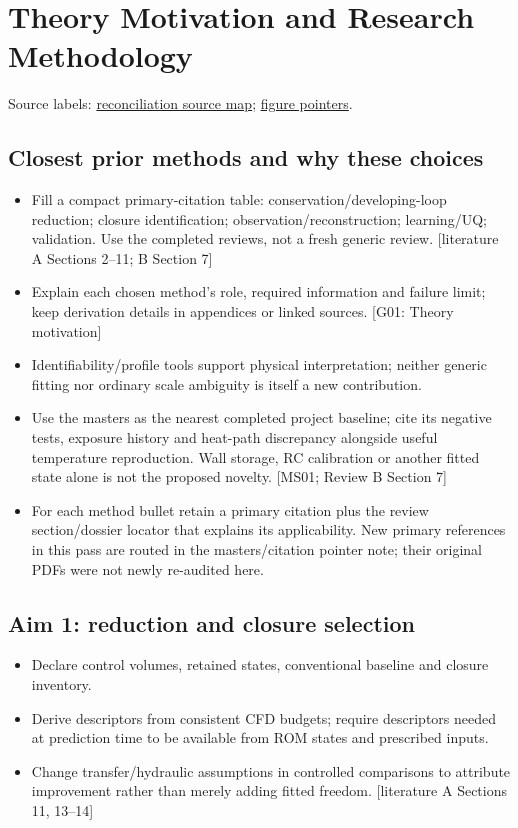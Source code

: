 \section{Theory Motivation and Research Methodology}
\noindent\small Source labels: \href{run:doc_support/reconciliation/2026-11-02/SOURCES.md}{reconciliation source map}; \href{run:doc_support/reconciliation/2026-11-02/FIGURE_POINTERS.md}{figure pointers}.\normalsize

\subsection{Closest prior methods and why these choices}
\begin{itemize}[leftmargin=*]
\item Fill a compact primary-citation table: conservation/developing-loop reduction; closure identification; observation/reconstruction; learning/UQ; validation. Use the completed reviews, not a fresh generic review. [literature A Sections 2--11; B Section 7]
\item Explain each chosen method's role, required information and failure limit; keep derivation details in appendices or linked sources. [G01: Theory motivation]
\item Identifiability/profile tools support physical interpretation; neither generic fitting nor ordinary scale ambiguity is itself a new contribution.\cite{raue2009identifiability}
\item Use the master\textquotesingle{}s as the nearest completed project baseline; cite its negative tests, exposure history and heat-path discrepancy alongside useful temperature reproduction. Wall storage, RC calibration or another fitted state alone is not the proposed novelty. [MS01; Review B Section 7]\cite{fierro2026cfdoneD}
\item For each method bullet retain a primary citation plus the review section/dossier locator that explains its applicability. New primary references in this pass are routed in the master\textquotesingle{}s/citation pointer note; their original PDFs were not newly re-audited here.
\end{itemize}

\subsection{Aim 1: reduction and closure selection}
\begin{itemize}[leftmargin=*]
\item Declare control volumes, retained states, conventional baseline and closure inventory.
\item Derive descriptors from consistent CFD budgets; require descriptors needed at prediction time to be available from ROM states and prescribed inputs.
\item Change transfer/hydraulic assumptions in controlled comparisons to attribute improvement rather than merely adding fitted freedom. [literature A Sections 11, 13--14]
\end{itemize}

